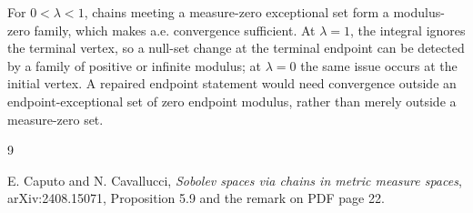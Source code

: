 \documentclass[11pt]{article}
\begin{document}
For $0<\lambda<1$, chains meeting a measure-zero exceptional set form
a modulus-zero family, which makes a.e. convergence sufficient.  At
$\lambda=1$, the integral ignores the terminal vertex, so a null-set
change at the terminal endpoint can be detected by a family of positive
or infinite modulus; at $\lambda=0$ the same issue occurs at the initial
vertex.  A repaired endpoint statement would need convergence outside
an endpoint-exceptional set of zero endpoint modulus, rather than merely
outside a measure-zero set.

\begin{thebibliography}{9}
\raggedright
{}
E. Caputo and N. Cavallucci,
\emph{Sobolev spaces via chains in metric measure spaces},
arXiv:2408.15071, Proposition 5.9 and the remark on PDF page 22.
\end{thebibliography}
\end{document}
